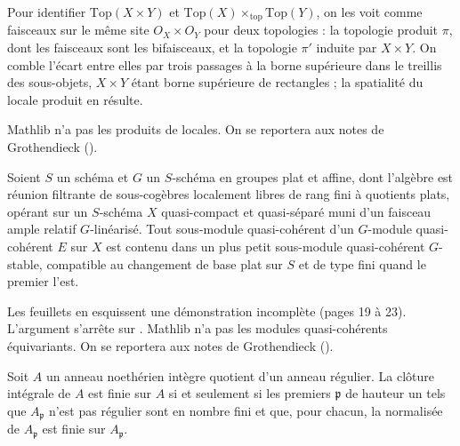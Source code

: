 \begin{encadre}
\begin{methode*}
Pour identifier $\mathrm{Top}(X \times Y)$ et $\mathrm{Top}(X) \times_{\mathrm{top}} \mathrm{Top}(Y)$, on les voit comme faisceaux sur le même site $O_X \times O_Y$ pour deux topologies : la topologie produit $\pi$, dont les faisceaux sont les bifaisceaux, et la topologie $\pi'$ induite par $X \times Y$. On comble l'écart entre elles par trois passages à la borne supérieure dans le treillis des sous-objets, $X \times Y$ étant borne supérieure de rectangles ; la spatialité du locale produit en résulte.
\end{methode*}
\end{encadre}
{\small Mathlib n'a pas les produits de locales. On se reportera aux notes de Grothendieck ().\par}

\begin{encadre}
\begin{conjecture*}
Soient $S$ un schéma et $G$ un $S$-schéma en groupes plat et affine, dont l'algèbre est réunion filtrante de sous-cogèbres localement libres de rang fini à quotients plats, opérant sur un $S$-schéma $X$ quasi-compact et quasi-séparé muni d'un faisceau ample relatif $G$-linéarisé. Tout sous-module quasi-cohérent d'un $G$-module quasi-cohérent $E$ sur $X$ est contenu dans un plus petit sous-module quasi-cohérent $G$-stable, compatible au changement de base plat sur $S$ et de type fini quand le premier l'est.
\end{conjecture*}
\end{encadre}
{\small Les feuillets en esquissent une démonstration incomplète (pages 19 à 23). L'argument s'arrête sur . Mathlib n'a pas les modules quasi-cohérents équivariants. On se reportera aux notes de Grothendieck ().\par}

\begin{encadre}
\begin{theoreme*}\nonverifie
Soit $A$ un anneau noethérien intègre quotient d'un anneau régulier. La clôture intégrale de $A$ est finie sur $A$ si et seulement si les premiers $\mathfrak p$ de hauteur un tels que $A_{\mathfrak p}$ n'est pas régulier sont en nombre fini et que, pour chacun, la normalisée de $A_{\mathfrak p}$ est finie sur $A_{\mathfrak p}$.
\end{theoreme*}
\end{encadre}

